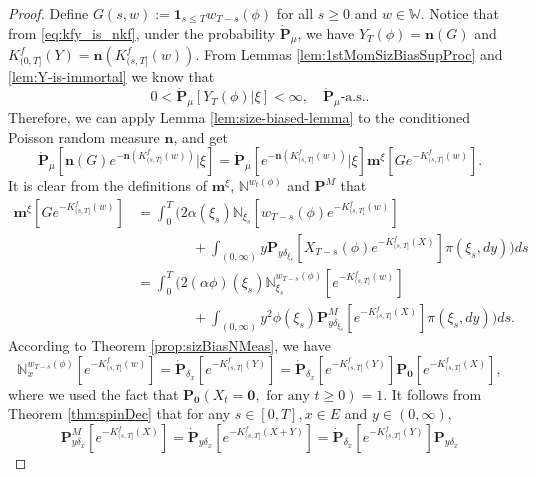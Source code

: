 \documentclass[UTF8]{pkuthss}
\theoremstyle{plain}
\theoremstyle{definition}
\numberwithin{equation}{section}
\begin{document}
\begin{proof}
	Define $G(s,w) := \mathbf 1_{s\leq T}w_{T-s}(\phi)$ for all $s\geq 0$ and $w\in\mathbb W$.
	Notice that from \eqref{eq:kfy_is_nkf}, under the probability $\dot {\mathbf P}_\mu$,
	we have $Y_T(\phi) = \mathbf n(G)$ and
	$K_{(0, T]}^f(Y) = \mathbf n(K^f_{(s,T]}(w))$.
	From Lemmas \ref{lem:1stMomSizBiasSupProc} and \ref{lem:Y-is-immortal} we know that
\[
	0
	< \dot{\mathbf P}_{\mu}[Y_T(\phi)|\xi]
	< \infty,
	\quad \dot{\mathbf P}_\mu \text{-a.s.}.
\]
	Therefore, we can apply Lemma \ref{lem:size-biased-lemma} to the conditioned
	Poisson random measure $\mathbf n$, and get
\begin{equation}\label{eq:condSizBiasEquatSpinImmigr}
    \dot{\mathbf P}_\mu [\mathbf n(G) e^{-\mathbf n(K^f_{(s, T]}(w))}|\xi]
	=\dot{\mathbf P}_\mu[e^{-\mathbf n(K^f_{(s, T]}(w))}|\xi]\mathbf m^\xi[Ge^{-K^f_{(s, T]}(w)}].
\end{equation}
	It is clear from the definitions of $\mathbf m^\xi$, $\mathbb N^{w_t(\phi)}$ and $\mathbf P^M$ that
\begin{align}\label{eq:represent-mGeKf}
    \mathbf m^\xi[Ge^{-K_{(s, T]}^f(w)}]
	&=\int_0^T \Big( 2\alpha(\xi_s)\mathbb N_{\xi_s}[w_{T-s}(\phi)e^{-K^f_{(s,T]}(w)}]\\
	&\qquad\qquad +\int_{(0,\infty)}y\mathbf P_{y\delta_{\xi_s}}[X_{T-s}(\phi)e^{-K^f_{(s,T]}(X)}]\pi(\xi_s,dy)\Big)ds\\
	&=\int_0^T \Big(2(\alpha\phi)(\xi_s)\mathbb N^{w_{T-s}(\phi)}_{\xi_s}[e^{-K^f_{(s,T]}(w)}] \\
	&\qquad\qquad + \int_{(0,\infty)}y^2\phi(\xi_s)\mathbf P^M_{y\delta_{\xi_s}}[e^{-K^f_{(s,T]}(X)}]\pi(\xi_s,dy)\Big)ds.
\end{align}
	According to  Theorem \ref{prop:sizBiasNMeas}, we have
\begin{equation}
\label{eq:represent-NxwTsphi}
	\mathbb N_x^{w_{T-s}(\phi)}[e^{-K^f_{(s,T]}(w)}]
	= \dot{\mathbf P}_{\delta_x}[e^{-K^f_{(s,T]}(Y)}]
	= \dot{\mathbf P}_{\delta_x}[e^{-K^f_{(s,T]}(Y)}]\mathbf P_{\mathbf 0}[e^{-K^f_{(s,T]}(X)}],
\end{equation}
	where we used the fact that $\mathbf P_{\mathbf 0}(X_t=\mathbf 0,\mbox{ for any }t\ge 0)=1$.
It follows from Theorem \ref{thm:spinDec} that for any $s\in [0,T], x\in E$ and $y\in (0,\infty)$,
\begin{equation}\label{eq:represent-PMydeltax}
	\mathbf P^M_{y\delta_x}[e^{-K^f_{(s,T]}(X)}]
	= \dot{\mathbf P}_{y\delta_x}[e^{-K^f_{(s,T]}(X+Y)}]
	=\dot{\mathbf P}_{\delta_x}[e^{-K^f_{(s,T]}(Y)}]\mathbf P_{y\delta_x}

\end{equation}
\end{proof}
\end{document}
